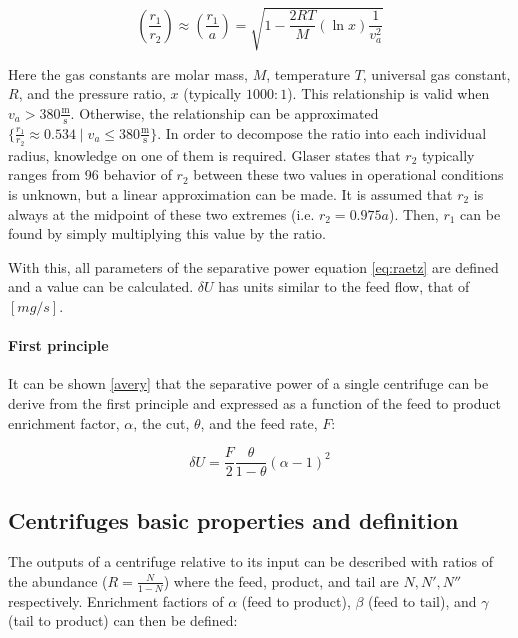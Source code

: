\begin{equation}
    (\frac{r_1}{r_2}) \approx (\frac{r_1}{a}) = \sqrt{1 - \frac{2RT}{M}(\ln x)\frac{1}{v_{a}^{2}}}
\end{equation}

Here the gas constants are molar mass, $M$, temperature $T$, universal gas constant, $R$,
and the pressure ratio, $x$ (typically $1000:1$).
This relationship is valid when $v_a > 380 \frac{\mathrm{m}}{\mathrm{s}}$.
Otherwise, the relationship can be approximated $\{\frac{r_1}{r_2} \approx 0.534 \mid v_a \leq 380 \frac{\mathrm{m}}{\mathrm{s}}\}$.
In order to decompose the ratio into each individual radius, knowledge on one
of them is required. Glaser \cite{glaser.2008} states that $r_2$ typically ranges
from 96%
behavior of $r_2$ between these two values in operational conditions is unknown,
but a linear approximation can be made. It is assumed that $r_2$ is always at
the midpoint of these two extremes (i.e. $r_2 = 0.975 a$). Then, $r_1$ can be
found by simply multiplying this value by the ratio.

With this, all parameters of the separative power equation \ref{eq:raetz} are
defined and a value can be calculated. $\delta U$ has units similar to the feed
flow, that of $[mg/s]$.

\paragraph{First principle}

It can be shown \ref{avery} that the separative power of a single centrifuge can be
derive from the first principle and expressed as a function of the feed to
product enrichment factor, $\alpha$, the cut, $\theta$, and the feed rate, $F$:

\begin{equation} \label{eq_alpha_principle}
    \delta U = \frac{F}{2}\frac{\theta}{1-\theta}(\alpha-1)^{2}
\end{equation}

\subsection{Centrifuges basic properties and definition}

The outputs of a centrifuge relative to its input can be described with ratios
of the abundance ($R = \frac{N}{1-N}$) where the feed, product, and tail are
$N, N', N''$ respectively. Enrichment factiors of $\alpha$ (feed to product),
$\beta$ (feed to tail), and $\gamma$ (tail to product) can then be defined:

